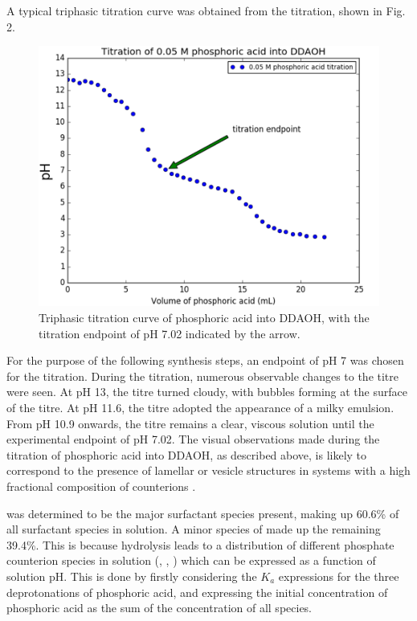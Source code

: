 \documentclass[a4paper,12pt,twocolumn]{article}
\begin{document}
  	A typical triphasic titration curve was obtained from the titration, shown in Fig. 2. 
  	
  	\begin{figure}[b!]
		\includegraphics[width=\linewidth]{titration.png}
  		\caption{Triphasic titration curve of phosphoric acid into DDAOH, with the titration endpoint of pH 7.02 indicated by the arrow.}
  	\end{figure}
  	
  	For the purpose of the following synthesis steps, an endpoint of pH 7 was chosen for the titration. During the titration, numerous observable changes to the titre were seen. At pH 13, the titre turned cloudy, with bubbles forming at the surface of the titre. At pH 11.6, the titre adopted the appearance of a milky emulsion. From pH 10.9 onwards, the titre remains a clear, viscous solution until the experimental endpoint of pH 7.02. The visual observations made during the titration of phosphoric acid into DDAOH, as described above, is likely to correspond to the presence of lamellar or vesicle structures in  systems with a high fractional composition of  counterions \cite{liu2014}. 
  	
  	
  	 was determined to be the major surfactant species present, making up 60.6\% of all surfactant species in solution. A minor species of  made up the remaining 39.4\%. This is because hydrolysis leads to a distribution of different phosphate counterion species in solution (, , ) which can be expressed as a function of solution pH. This is done by firstly considering the $K_a$ expressions for the three deprotonations of phosphoric acid, and expressing the initial concentration of phosphoric acid as the sum of the concentration of all species. 
  	
\end{document}
